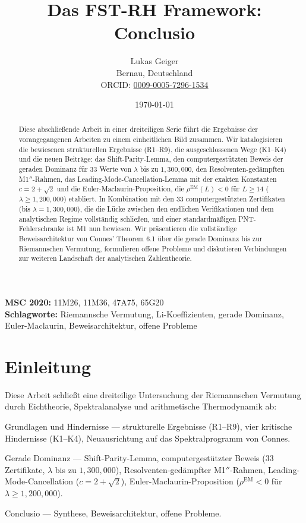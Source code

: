 \documentclass[12pt,a4paper]{article}
\title{Das FST-RH Framework: Conclusio}
\author{Lukas Geiger\\
\small Bernau, Deutschland\\
\small ORCID: \href{https://orcid.org/0009-0005-7296-1534}{0009-0005-7296-1534}}
\date{\today}
\theoremstyle{definition}
\theoremstyle{remark}
\begin{document}
\maketitle

\begin{abstract}
Diese abschließende Arbeit in einer dreiteiligen Serie führt die Ergebnisse der vorangegangenen Arbeiten zu einem einheitlichen Bild zusammen. Wir katalogisieren die bewiesenen strukturellen Ergebnisse (R1--R9), die ausgeschlossenen Wege (K1--K4) und die neuen Beiträge: das Shift-Parity-Lemma, den computergestützten Beweis der geraden Dominanz für 33 Werte von $\lambda$ bis zu $1{,}300{,}000$, den Resolventen-gedämpften M1$''$-Rahmen, das Leading-Mode-Cancellation-Lemma mit der exakten Konstanten $c = 2 + \sqrt{2}$ und die Euler-Maclaurin-Proposition, die $\rho^{\mathrm{EM}}(L) < 0$ für $L \geq 14$ ($\lambda \geq 1{,}200{,}000$) etabliert. In Kombination mit den $33$ computergestützten Zertifikaten (bis $\lambda = 1{,}300{,}000$), die die Lücke zwischen den endlichen Verifikationen und dem analytischen Regime vollständig schließen, und einer standardmäßigen PNT-Fehlerschranke ist M1 nun bewiesen. Wir präsentieren die vollständige Beweisarchitektur von Connes' Theorem 6.1 über die gerade Dominanz bis zur Riemannschen Vermutung, formulieren offene Probleme und diskutieren Verbindungen zur weiteren Landschaft der analytischen Zahlentheorie.
\end{abstract}

\noindent\textbf{MSC 2020:} 11M26, 11M36, 47A75, 65G20\\
\textbf{Schlagworte:} Riemannsche Vermutung, Li-Koeffizienten, gerade Dominanz, Euler-Maclaurin, Beweisarchitektur, offene Probleme

\newpage
\tableofcontents


\section{Einleitung}
\label{sec:intro}

Diese Arbeit schließt eine dreiteilige Untersuchung der Riemannschen Vermutung durch Eichtheorie, Spektralanalyse und arithmetische Thermodynamik ab:
\begin{description}[font=\bfseries,leftmargin=2em]
  \item[Teil~I \cite{Geiger2026partI}:] Grundlagen und Hindernisse --- strukturelle Ergebnisse (R1--R9), vier kritische Hindernisse (K1--K4), Neuausrichtung auf das Spektralprogramm von Connes.
  \item[Teil~II \cite{Geiger2026partII}:] Gerade Dominanz --- Shift-Parity-Lemma, computergestützter Beweis ($33$ Zertifikate, $\lambda$ bis zu $1{,}300{,}000$), Resolventen-gedämpfter M1$''$-Rahmen, Leading-Mode-Cancellation ($c = 2 + \sqrt{2}$), Euler-Maclaurin-Proposition ($\rho^{\mathrm{EM}} < 0$ für $\lambda \geq 1{,}200{,}000$).
  \item[Teil~III (diese Arbeit):] Conclusio --- Synthese, Beweisarchitektur, offene Probleme.
\end{description}
\end{document}
